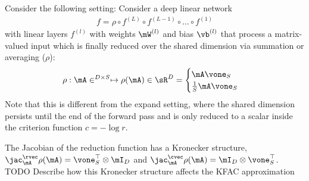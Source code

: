 Consider the following setting: Consider a deep linear network
\begin{align*}
  f = \rho \circ f^{(L)} \circ f^{(L-1)} \circ \ldots \circ f^{(1)}
\end{align*}
with linear layers $f^{(l)}$ with weights $\mW^{(l)}$ and bias $\vb^{(l)}$ that process a matrix-valued input which is finally reduced over the shared dimension via summation or averaging ($\rho$):
\begin{align*}
  \rho: \mA \in^{D \times S}
  \mapsto
  \rho(\mA)
  \in \sR^D
  =
  \begin{cases}
    \mA \vone_S
    \\
    \frac{1}{S} \mA \vone_S
  \end{cases}
\end{align*}
Note that this is different from the expand setting, where the shared dimension persists until the end of the forward pass and is only reduced to a scalar inside the criterion function $c = - \log r$.

The Jacobian of the reduction function has a Kronecker structure,
$\jac_{\mA}^{\rvec}\rho(\mA) = \vone_S^{\top} \otimes \mI_D$ and $\jac_{\mA}^{\cvec}\rho(\mA) = \mI_D \otimes \vone_S^{\top}$.
TODO Describe how this Kronecker structure affects the KFAC approximation


